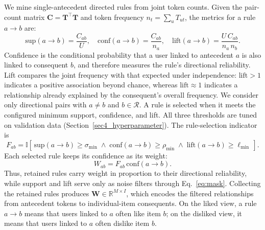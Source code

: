 \documentclass[pdflatex,sn-vancouver-num]{sn-jnl}%
\theoremstyle{thmstyleone}%
\theoremstyle{thmstyletwo}%
\theoremstyle{thmstylethree}%
\begin{document}
We mine single-antecedent directed rules from joint token counts. Given the pair-count matrix $\mathbf{C} = \mathbf{T}^{\top}\mathbf{T}$ and token frequency $n_t = \sum_{u} T_{ut}$, the metrics for a rule $a \rightarrow b$ are:
\begin{equation}
\mathrm{sup}(a \rightarrow b) = \frac{C_{ab}}{U}, \quad
\mathrm{conf}(a \rightarrow b) = \frac{C_{ab}}{n_a}, \quad
\mathrm{lift}(a \rightarrow b) = \frac{U \, C_{ab}}{n_a \, n_b}.
\label{eq:metrics}
\end{equation}
Confidence is the conditional probability that a user linked to antecedent $a$ is also linked to consequent $b$, and therefore measures the rule's directional reliability. Lift compares the joint frequency with that expected under independence: $\mathrm{lift}>1$ indicates a positive association beyond chance, whereas $\mathrm{lift}\approx 1$ indicates a relationship already explained by the consequent's overall frequency. We consider only directional pairs with $a \neq b$ and $b \in \mathcal{R}$. A rule is selected when it meets the configured minimum support, confidence, and lift. All three thresholds are tuned on validation data (Section~\ref{sec4_hyperparameter}). The rule-selection indicator is
\begin{equation}
F_{ab} = \mathbb{I}\!\left[\,
\mathrm{sup}(a \rightarrow b) \ge \sigma_{\min} \;\land\;
\mathrm{conf}(a \rightarrow b) \ge \rho_{\min} \;\land\;
\mathrm{lift}(a \rightarrow b) \ge \ell_{\min}
\,\right].
\label{eq:mask}
\end{equation}
Each selected rule keeps its confidence as its weight:
\begin{equation}
W_{ab} = F_{ab}\,\mathrm{conf}(a \rightarrow b).
\label{eq:rule_weight}
\end{equation}
Thus, retained rules carry weight in proportion to their directional reliability, while support and lift serve only as noise filters through Eq.~\eqref{eq:mask}. Collecting the retained rules produces $\mathbf{W} \in \mathbb{R}^{M \times I}$, which encodes the filtered relationships from antecedent tokens to individual-item consequents. On the liked view, a rule $a \rightarrow b$ means that users linked to $a$ often like item $b$; on the disliked view, it means that users linked to $a$ often dislike item $b$.
\end{document}
